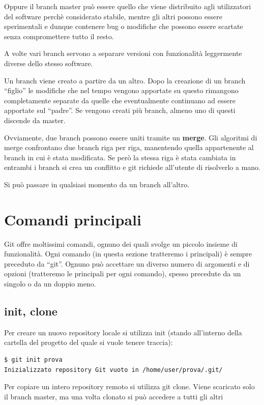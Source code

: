 \documentclass{article} \usepackage[textwidth=18cm,textheight=18cm]{geometry}
\begin{document}
Oppure il branch master può essere quello che viene distribuito agli
utilizzatori del software perchè considerato stabile, mentre gli altri possono
essere sperimentali e dunque contenere bug o modifiche che possono essere 
scartate senza compromettere tutto il resto. 

A volte vari branch servono a separare versioni
con funzionalità leggermente diverse dello stesso software.

Un branch viene creato a partire da un altro. Dopo la creazione di un branch
``figlio'' le modifiche che nel tempo vengono apportate su questo rimangono
completamente separate da quelle che eventualmente continuano ad essere
apportate sul ``padre''. Se vengono creati più branch, almeno uno di questi discende
da master.

Ovviamente, due branch possono essere uniti tramite un \textbf{merge}. Gli
algoritmi di merge confrontano due branch riga per riga, manentendo quella
appartenente al branch in cui è stata modificata. Se però la stessa riga è stata
cambiata in entrambi i branch si crea un conflitto e git richiede all'utente di 
risolverlo a mano.

Si può passare in qualsiasi momento da un branch all'altro.

\section{Comandi principali}

Git offre moltissimi comandi, ognuno dei quali svolge un piccolo insieme di
funzionalità. Ogni comando (in questa sezione tratteremo i principali) è sempre preceduto da
``git''. Ognuno può accettare un diverso numero di argomenti e di opzioni
(tratteremo le principali per ogni comando), spesso precedute da un singolo o da
un doppio meno. 

\subsection{init, clone}

Per creare un nuovo repository locale si utilizza init (stando all'interno
della cartella del progetto del quale si vuole tenere traccia):

\begin{verbatim}
$ git init prova
Inizializzato repository Git vuoto in /home/user/prova/.git/
\end{verbatim}

Per copiare un intero repository remoto si utilizza git clone. Viene scaricato
solo il branch master, ma una volta clonato si può accedere a tutti gli altri
\end{document}
